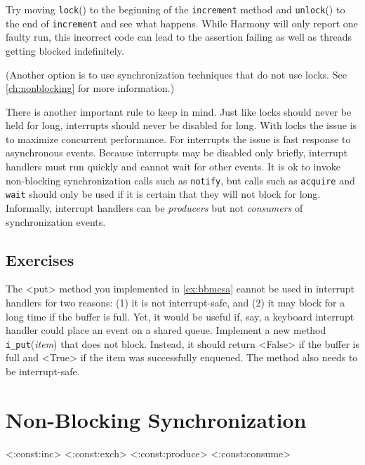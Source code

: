 \documentclass{report}
\begin{document}
{Try moving \texttt{lock}() to the beginning of the \texttt{increment} method
and \texttt{unlock}() to the end of \texttt{increment} and see what happens.
While Harmony will only report one faulty run, this incorrect code can lead to
the assertion failing as well as threads getting blocked indefinitely.

(Another option is to use synchronization techniques that do not use locks.
See \autoref{ch:nonblocking} for more information.)

There is another important rule to keep in mind.  Just like locks should never be held
for long, interrupts should never be disabled for long.  With locks the issue is to
maximize concurrent performance.  For interrupts the issue is fast response to
asynchronous events.  Because interrupts may be disabled only briefly, interrupt
handlers must run quickly and cannot wait for other events.  It is ok to invoke
non-blocking synchronization calls such as \texttt{notify}, but calls such as
\texttt{acquire} and \texttt{wait} should only be used if it is certain that they will not
block for long.  Informally, interrupt handlers can be
\emph{producers} but not \emph{consumers} of synchronization events.

\section*{Exercises}
\begin{problems}
\item The <{put}> method you implemented in \autoref{ex:bbmesa} cannot be used
in interrupt handlers for two reasons: (1) it is not interrupt-safe, and (2)
it may block for a long time if the buffer is full.  Yet, it would be useful if,
say, a keyboard interrupt handler could place an event on a shared queue.
Implement a new method \texttt{i\_put}(\textit{item}) that does not
block.  Instead, it should return <{False}> if the buffer is full and <{True}>
if the item was successfully enqueued.
The method also needs to be interrupt-safe.
\end{problems}

\chapter{Non-Blocking Synchronization}
\label{ch:nonblocking}
%

<{:const:inc}>
<{:const:exch}>
<{:const:produce}>
<{:const:consume}>

%

}
\end{document}
